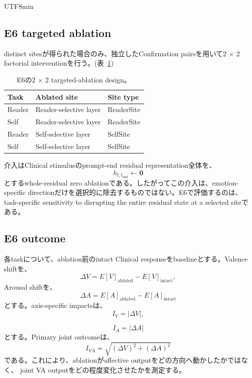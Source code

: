 \documentclass{article} %
\begin{document}
\begin{CJK*}{UTF8}{min}
\subsection{E6 targeted ablation}

distinct sitesが得られた場合のみ、独立したConfirmation pairsを用いて2 \(\times\) 2 factorial interventionを行う。(表~\ref{tab:v1-e6-design})

\begin{table}[htbp]
\centering
\small
\caption{E6の2 $\times$ 2 targeted-ablation design。}
\label{tab:v1-e6-design}
\begin{tabular}{lll}
\toprule
\textbf{Task} &
\textbf{Ablated site} &
\textbf{Site type} \\
\midrule
Reader & Reader-selective layer & ReaderSite \\
Self   & Reader-selective layer & ReaderSite \\
Reader & Self-selective layer   & SelfSite \\
Self   & Self-selective layer   & SelfSite \\
\bottomrule
\end{tabular}
\end{table}

介入はClinical stimulusのprompt-end residual representation全体を、
\[
h_{l,t_{\mathrm{end}}}
\leftarrow
\mathbf{0}
\]
とするwhole-residual zero ablationである。したがってこの介入は、emotion-specific directionだけを選択的に除去するものではない。E6で評価するのは、task-specific sensitivity to disrupting the entire residual state at a selected siteである。


\subsection{E6 outcome}

各taskについて、ablation前のintact Clinical responseをbaselineとする。Valence shiftを、
\[
\Delta V
=
E[V]_{\mathrm{ablated}}
-
E[V]_{\mathrm{intact}},
\]
Arousal shiftを、
\[
\Delta A
=
E[A]_{\mathrm{ablated}}
-
E[A]_{\mathrm{intact}}
\]
とする。axis-specific impactsは、
\[
I_V
=
|\Delta V|,
\]

\[
I_A
=
|\Delta A|
\]
とする。Primary joint outcomeは、
\[
I_{VA}
=
\sqrt{
(\Delta V)^2
+
(\Delta A)^2
}
\]
である。これにより、ablationがaffective outputをどの方向へ動かしたかではなく、
joint VA outputをどの程度変化させたかを測定する。


\end{CJK*}
\end{document}
